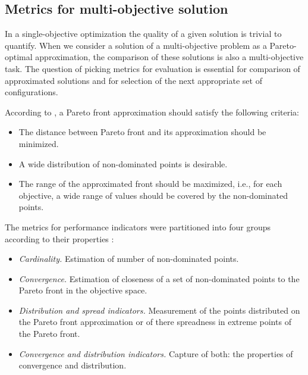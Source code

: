 
        \subsection{Metrics for multi-objective solution}
            In a single-objective optimization the quality of a given solution is trivial to quantify. When we consider a solution of a multi-objective problem as a Pareto-optimal approximation, the comparison of these solutions is also a multi-objective task.
            The question of picking metrics for evaluation is essential for comparison of approximated solutions and for selection of the next appropriate set of configurations.

            According to \cite{ZitzlerDT00}, a Pareto front approximation should satisfy the following criteria:
            \begin{itemize}
                \item The distance between Pareto front and its approximation should be minimized.
                \item A wide distribution of non-dominated points is desirable.
                \item The range of the approximated front should be maximized, i.e., for each objective, a wide range of values should be covered by the non-dominated points.
            \end{itemize}

            The metrics for performance indicators were partitioned into four groups according to their properties \cite{Audet2018PerformanceII}: 
            \begin{itemize}
                \item \textit{Cardinality.} Estimation of number of non-dominated points.
                \item \textit{Convergence.} Estimation of closeness of a set of non-dominated points to the Pareto front in the objective space.
                \item \textit{Distribution and spread indicators.}  Measurement of the points distributed on the Pareto front approximation or of there spreadness in extreme points of the Pareto front.
                \item \textit{Convergence and distribution indicators.} Capture of both: the properties of convergence and distribution.
            \end{itemize}

